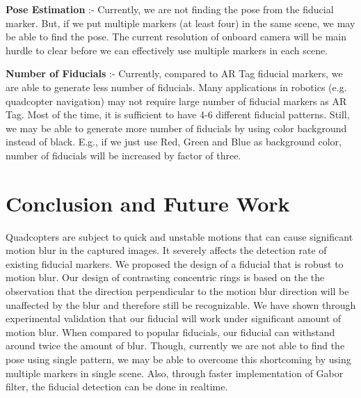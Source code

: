 \documentclass[runningheads]{llncs}
\begin{document}
\noindent\textbf{Pose Estimation} :- Currently, we are not finding the pose from
the fiducial marker. But, if we put multiple markers (at least four) in the same
scene, we may be able to find the pose. The current resolution of onboard camera
will be main hurdle to clear before we can effectively use multiple markers in
each scene.

\noindent\textbf{Number of Fiducials} :- Currently, compared to AR Tag fiducial
markers, we are able to generate less number of fiducials. Many applications in
robotics (e.g. quadcopter navigation) may not require large number of fiducial
markers as AR Tag. Most of the time, it is sufficient to have 4-6
different fiducial patterns. Still, we may be able to generate more number of
fiducials by using color background instead of black. E.g., if we just use Red,
Green and Blue as background color, number of fiducials will be increased by
factor of three.

\section{Conclusion and Future Work}
Quadcopters are subject to quick and unstable motions that can cause significant
motion blur in the captured images. It severely affects the detection rate of
existing fiducial markers. We proposed the design of a fiducial that is robust
to motion blur. Our design of contrasting concentric rings is based on the the
observation that the direction perpendicular to the motion blur direction will
be unaffected by the blur and therefore still be recognizable. We have shown
through experimental validation that our fiducial will work under significant
amount of motion blur. When compared to popular fiducials, our fiducial can
withstand around twice the amount of blur.  Though, currently we are not able to
find the pose using single pattern, we may be able to overcome this
shortcoming by using multiple markers in single scene. Also, through faster
implementation of Gabor filter, the fiducial detection can be done in realtime.



\end{document}
